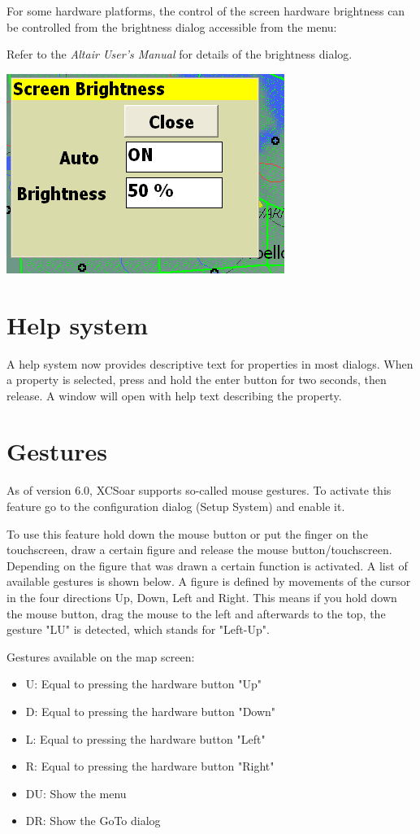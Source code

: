 \documentclass[a4paper,12pt]{refrep}
\begin{document}
For some hardware platforms, the control of the screen hardware 
brightness can be controlled from the brightness dialog
accessible from the menu:
\begin{quote}
\blink{}
\end{quote}

Refer to the {\em Altair User's Manual} for details of the brightness
dialog.

\begin{center}
\includegraphics[angle=0,width=0.45\linewidth,keepaspectratio='true']{figures/brightness.png}
\end{center}

\section{Help system}
  A help system now provides descriptive text for properties in
  most dialogs.  When a property is selected, press and hold the
  enter button for two seconds, then release.  A window will open with
  help text describing the property.

\section{Gestures}
  As of version 6.0, XCSoar supports so-called mouse gestures. To activate 
  this feature go to the configuration dialog (Setup System) and enable it.

  To use this feature hold down the mouse button or put the finger on the 
  touchscreen, draw a certain figure and release the mouse 
  button/touchscreen. Depending on the figure that was drawn 
  a certain function is activated. A list of available gestures is 
  shown below. A figure is defined by movements of the 
  cursor in the four directions Up, Down, Left and Right. This means if 
  you hold down the mouse button, drag the mouse to the left 
  and afterwards to the top, the gesture "LU" is detected, which 
  stands for "Left-Up".


  Gestures available on the map screen:
\begin{itemize}
\item U: Equal to pressing the hardware button "Up"
\item D: Equal to pressing the hardware button "Down"
\item L: Equal to pressing the hardware button "Left"
\item R: Equal to pressing the hardware button "Right"
\item DU: Show the menu
\item DR: Show the GoTo dialog
\end{itemize}
\end{document}
